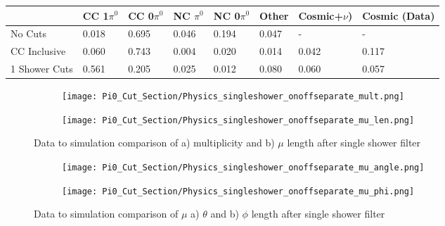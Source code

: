 \begin{table}[H]
\centering
{}
 \begin{tabular}{| l | l | l |l|l|l|l|l|}
 \hline
  & CC 1$\pi^0$ & CC 0$\pi^0$ & NC $\pi^0$ & NC 0$\pi^0$ & Other& Cosmic+$\nu$) & Cosmic (Data) \\ [0.1ex] \hline
No Cuts  & 0.018 &  0.695 & 0.046 & 0.194  & 0.047 & -&-\\
CC Inclusive & 0.060 & 0.743 & 0.004 & 0.020 & 0.014 & 0.042 & 0.117  \\ 
1 Shower Cuts & 0.561 & 0.205 & 0.025 & 0.012 & 0.080 & 0.060 & 0.057 \\ \hline
\end{tabular}
\end{table}

\begin{figure}[H]
\centering
  \begin{subfigure}[t]{0.4\textwidth}
    \centering
\texttt{[image: Pi0\_Cut\_Section/Physics\_singleshower\_onoffseparate\_mult.png]}
  \caption{ }
  \end{subfigure} 
  \hspace{20mm}
  \begin{subfigure}[t]{0.4\textwidth}
    \centering
\texttt{[image: Pi0\_Cut\_Section/Physics\_singleshower\_onoffseparate\_mu\_len.png]}
  \caption{ }
  \end{subfigure} 

\caption{ Data to simulation comparison of a) multiplicity and b) $\mu$ length after single shower filter }
\label{fig:physics_singleshower_mulen}
\end{figure}

\begin{figure}[H]
  \begin{subfigure}[t]{0.3\textwidth}
\texttt{[image: Pi0\_Cut\_Section/Physics\_singleshower\_onoffseparate\_mu\_angle.png]}
  \caption{ }
  \end{subfigure} 
  \hspace{20mm}
  \begin{subfigure}[t]{0.3\textwidth}
\texttt{[image: Pi0\_Cut\_Section/Physics\_singleshower\_onoffseparate\_mu\_phi.png]}
  \caption{ }
  \end{subfigure} 
\caption{ Data to simulation comparison of $\mu$ a) $\theta$ and b) $\phi$ length after single shower filter }
\label{fig:physics_singleshower_muphi}
\end{figure}

